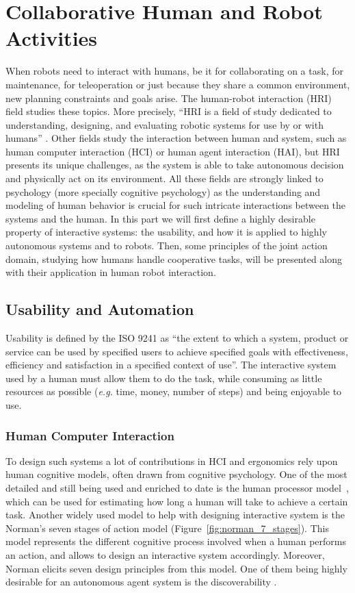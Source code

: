 \documentclass[a4paper,11pt,twoside]{StyleThese}
\begin{document}
\section{Collaborative Human and Robot Activities}
When robots need to interact with humans, be it for collaborating on a task, for maintenance, for teleoperation or just because they share a common environment, new planning constraints and goals arise. The human-robot interaction (HRI) field studies these topics. More precisely, ``HRI is a field of study dedicated to understanding, designing, and evaluating robotic systems for use by or with humans'' \cite{goodrich_human-robot_2007}. Other fields study the interaction between human and system, such as human computer interaction (HCI) or human agent interaction (HAI), but HRI presents its unique challenges, as the system is able to take autonomous decision and physically act on its environment.
All these fields are strongly linked to psychology (more specially cognitive psychology) as the understanding and modeling of human behavior is crucial for such intricate interactions between the systems and the human.
In this part we will first define a highly desirable property of interactive systems: the usability, and how it is applied to highly autonomous systems and to robots. Then, some principles of the joint action domain, studying how humans handle cooperative tasks, will be presented along with their application in human robot interaction.

\subsection{Usability and Automation}
Usability is defined by the ISO 9241 as ``the extent to which a system, product or service can be used by specified users to achieve specified goals with effectiveness, efficiency and satisfaction in a specified context of use''. The interactive system used by a human must allow them to do the task, while consuming as little resources as possible (\textit{e.g.} time, money, number of steps) and being enjoyable to use.

\subsubsection{Human Computer Interaction}

To design such systems a lot of contributions in HCI and ergonomics rely upon human cognitive models, often drawn from cognitive psychology. One of the most detailed and still being used and enriched to date is the human processor model~\cite{card1983psychology}, which can be used for estimating how long a human will take to achieve a certain task. Another widely used model to help with designing interactive system is the Norman's seven stages of action model (Figure~\ref{fig:norman_7_stages}). This model represents the different cognitive process involved when a human performs an action, and allows to design an interactive system accordingly. Moreover, Norman elicits seven design principles from this model. One of them being highly desirable for an autonomous agent system is the discoverability \cite{norman2013design}.
\end{document}
